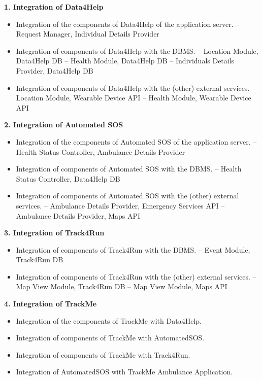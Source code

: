 \textbf{1. Integration of Data4Help} 
\begin{itemize}
\item Integration of the components of Data4Help of the application server.\newline
-- Request Manager, Individual Details Provider
\item Integration of components of Data4Help with the DBMS. \newline
-- Location Module, Data4Help DB\newline
-- Health Module, Data4Help DB\newline
-- Individuals Details Provider, Data4Help DB
\item Integration of components of Data4Help with the (other) external services. \newline
-- Location Module, Wearable Device API\newline
-- Health Module, Wearable Device API\newline
\end{itemize}
\textbf{2. Integration of Automated SOS}
\begin{itemize}
\item Integration of the components of Automated SOS of the application server.\newline
-- Health Status Controller, Ambulance Details Provider
\item Integration of components of Automated SOS with the DBMS. \newline 
-- Health Status Controller, Data4Help DB
\item Integration of components of Automated SOS with the (other) external services. \newline
-- Ambulance Details Provider, Emergency Services API\newline
-- Ambulance Details Provider, Maps API\newline
\end{itemize}
\textbf{3. Integration of Track4Run}
\begin{itemize}
\item Integration of components of Track4Run with the DBMS. \newline 
-- Event Module, Track4Run DB
\item Integration of components of Track4Run with the (other) external services. \newline
-- Map View Module, Track4Run DB
-- Map View Module, Maps API
\end{itemize}
\textbf{4. Integration of TrackMe}
\begin{itemize}
\item Integration of the components of TrackMe with Data4Help.
\item Integration of components of TrackMe with AutomatedSOS. 
\item Integration of components of TrackMe with Track4Run. 
\item Integration of AutomatedSOS with TrackMe Ambulance Application.
\end{itemize}